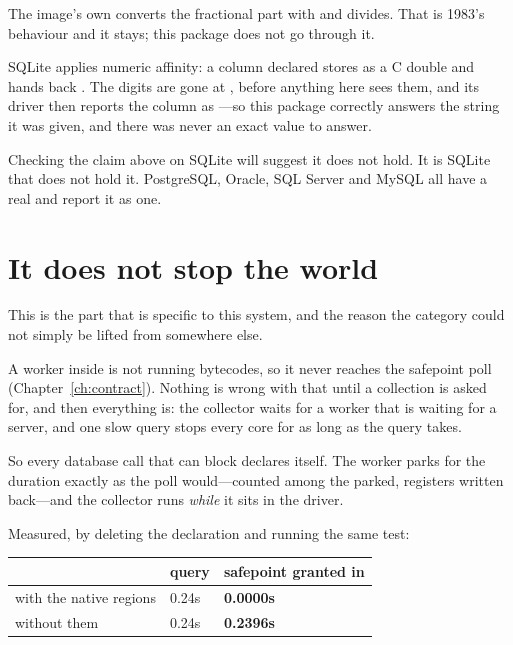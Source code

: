 The image's own  converts the fractional part with
 and divides. That is 1983's behaviour and it stays; this package
does not go through it.

\begin{stwarn}
SQLite applies numeric affinity: a column declared  stores
 as a C double and hands back
. The digits are gone at , before anything
here sees them, and its driver then reports the column as ---so
this package correctly answers the string it was given, and there was never an
exact value to answer.

Checking the claim above on SQLite will suggest it does not hold. It is SQLite
that does not hold it. PostgreSQL, Oracle, SQL Server and MySQL all have a
real  and report it as one.
\end{stwarn}

\section{It does not stop the world}

This is the part that is specific to this system, and the reason the category
could not simply be lifted from somewhere else.

A worker inside  is not running bytecodes, so it never reaches
the safepoint poll (Chapter~\ref{ch:contract}). Nothing is wrong with that
until a collection is asked for, and then everything is: the collector waits
for a worker that is waiting for a server, and one slow query stops every core
for as long as the query takes.

So every database call that can block declares itself. The worker parks for
the duration exactly as the poll would---counted among the parked, registers
written back---and the collector runs \emph{while} it sits in the driver.

Measured, by deleting the declaration and running the same test:

\begin{center}
\small
\begin{tabular}{@{}lll@{}}
\toprule
& query & safepoint granted in\\
\midrule
with the native regions & 0.24s & \textbf{0.0000s}\\
without them & 0.24s & \textbf{0.2396s}\\
\bottomrule
\end{tabular}
\end{center}


